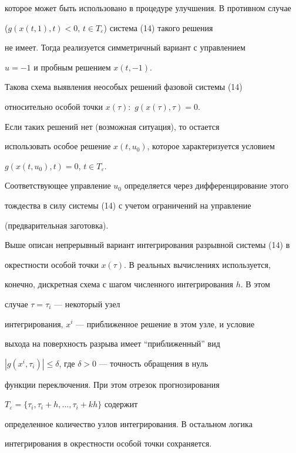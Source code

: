 которое может быть использовано в процедуре улучшения. В противном случае 


($g(x(t,1),t)<0$, $t\in T_{\varepsilon}$) система (14) такого решения 


не имеет. Тогда реализуется симметричный вариант с управлением 


$u=-1$ и пробным решением $x(t,-1)$.





Такова схема выявления неособых решений фазовой системы (14) 


относительно особой точки $x(\tau):$ $g(x(\tau),\tau)=0$. 


Если таких решений нет (возможная ситуация), то остается 


использовать особое решение $x(t,u_0)$, которое характеризуется условием 


$g(x(t,u_0),t)=0$, $t\in T_{\varepsilon}$.


Соответствующее управление $u_0$ определяется через дифференцирование этого 


тождества в силу системы (14) с учетом ограничений на управление


(предварительная заготовка).


	


Выше описан непрерывный вариант интегрирования разрывной системы (14) в 


окрестности особой точки $x(\tau)$. В реальных вычислениях используется, 


конечно, дискретная схема с шагом численного интегрирования $h$. В этом 


случае $\tau=\tau_i$ --- некоторый узел 


интегрирования, $x^i$ --- приближенное решение в этом узле, и условие 


выхода на поверхность разрыва имеет ``приближенный'' вид 


$|g(x^i,\tau_i)|\leq\delta$, где $\delta >0$ --- точность обращения в нуль 


функции переключения. При этом отрезок прогнозирования


$T_{\varepsilon}=\{\tau_i,\tau_i+h,\dotsc, \tau_i+kh\}$ содержит


определенное количество узлов интегрирования. В остальном логика 


интегрирования в окрестности особой точки сохраняется.





